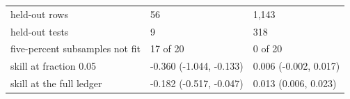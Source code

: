 \begin{tabular}{lll}
held-out rows & 56 & 1,143 \\
held-out tests & 9 & 318 \\
five-percent subsamples not fit & 17 of 20 & 0 of 20 \\
skill at fraction 0.05 & -0.360 (-1.044, -0.133) & 0.006 (-0.002, 0.017) \\
skill at the full ledger & -0.182 (-0.517, -0.047) & 0.013 (0.006, 0.023) \\
\bottomrule
\end{tabular}
